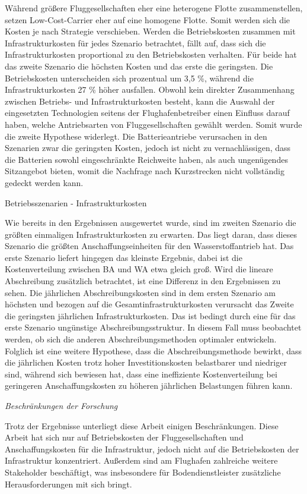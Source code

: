 Während größere Fluggesellschaften eher eine heterogene Flotte zusammenstellen, 
setzen Low-Cost-Carrier eher auf eine homogene Flotte.
Somit werden sich die Kosten je nach Strategie verschieben.
Werden die Betriebskosten zusammen mit Infrastrukturkosten für jedes Szenario betrachtet, fällt auf, 
dass sich die Infrastrukturkosten proportional zu den Betriebskosten verhalten. 
Für beide hat das zweite Szenario die höchsten Kosten und das erste die geringsten. 
Die Betriebskosten unterscheiden sich prozentual um 3,5 \%, 
während die Infrastrukturkosten 27 \% höher ausfallen.
Obwohl kein direkter Zusammenhang zwischen Betriebs- und Infrastrukturkosten besteht, 
kann die Auswahl der eingesetzten Technologien seitens der Flughafenbetreiber einen Einfluss darauf haben, 
welche Antriebsarten von Fluggesellschaften gewählt werden. Somit wurde die zweite Hypothese widerlegt.
Die Batterieantriebe verursachen in den Szenarien zwar die geringsten Kosten,
jedoch ist nicht zu vernachlässigen, dass die Batterien sowohl eingeschränkte Reichweite haben, 
als auch ungenügendes Sitzangebot bieten, womit die Nachfrage nach Kurzstrecken nicht vollständig gedeckt werden kann.

Betriebsszenarien - Infrastrukturkosten

Wie bereits in den Ergebnissen ausgewertet wurde, sind im zweiten Szenario die größten einmaligen Infrastrukturkosten zu erwarten.
Das liegt daran, dass dieses Szenario die größten Anschaffungseinheiten für den Wasserstoffantrieb hat. 
Das erste Szenario liefert hingegen das kleinste Ergebnis, dabei ist die Kostenverteilung zwischen BA und WA etwa gleich groß.
Wird die lineare Abschreibung zusätzlich betrachtet, ist eine Differenz in den Ergebnissen zu sehen. 
Die jährlichen Abschreibungskosten sind in dem ersten Szenario am höchsten 
und bezogen auf die Gesamtinfrastrukturkosten verursacht das Zweite 
die geringsten jährlichen Infrastrukturkosten.
Das ist bedingt durch eine für das erste Szenario ungünstige Abschreibungsstruktur. 
In diesem Fall muss beobachtet werden, ob sich die anderen Abschreibungsmethoden optimaler entwickeln.
Folglich ist eine weitere Hypothese, dass die Abschreibungsmethode bewirkt, 
dass die jährlichen Kosten trotz hoher Investitionskosten belastbarer und niedriger sind, 
während sich bewiesen hat, dass eine ineffiziente Kostenverteilung bei geringeren Anschaffungskosten zu 
höheren jährlichen Belastungen führen kann.

\textit{Beschränkungen der Forschung}

Trotz der Ergebnisse unterliegt diese Arbeit einigen Beschränkungen. %
Diese Arbeit hat sich nur auf Betriebskosten der Fluggesellschaften und Anschaffungskosten für die Infrastruktur,
jedoch nicht auf die Betriebskosten der Infrastruktur konzentriert. 
Außerdem sind am Flughafen zahlreiche weitere Stakeholder beschäftigt, 
was insbesondere für Bodendienstleister zusätzliche Herausforderungen mit sich bringt.

